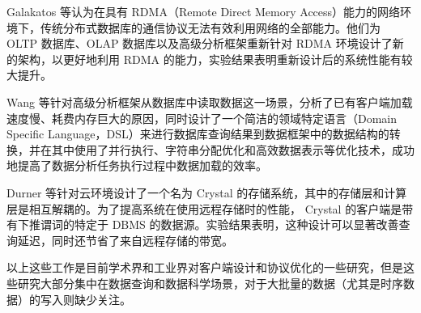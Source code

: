 Galakatos 等认为在具有 RDMA（Remote Direct Memory Access）\cite{recio2007remote}能力的网络环境下，传统分布式数据库的通信协议无法有效利用网络的全部能力。他们为 OLTP 数据库、OLAP 数据库以及高级分析框架重新针对 RDMA 环境设计了新的架构，以更好地利用 RDMA 的能力，实验结果表明重新设计后的系统性能有较大提升\cite{galakatos2016end}。

Wang 等针对高级分析框架从数据库中读取数据这一场景，分析了已有客户端加载速度慢、耗费内存巨大的原因，同时设计了一个简洁的领域特定语言（Domain Specific Language，DSL）来进行数据库查询结果到数据框架中的数据结构的转换，并在其中使用了并行执行、字符串分配优化和高效数据表示等优化技术，成功地提高了数据分析任务执行过程中数据加载的效率\cite{wang2022connectorx}。

Durner 等针对云环境设计了一个名为 Crystal 的存储系统，其中的存储层和计算层是相互解耦的。为了提高系统在使用远程存储时的性能， Crystal 的客户端是带有下推谓词的特定于 DBMS 的数据源。实验结果表明，这种设计可以显著改善查询延迟，同时还节省了来自远程存储的带宽\cite{durner2021crystal}。

以上这些工作是目前学术界和工业界对客户端设计和协议优化的一些研究，但是这些研究大部分集中在数据查询和数据科学场景，对于大批量的数据（尤其是时序数据）的写入则缺少关注。